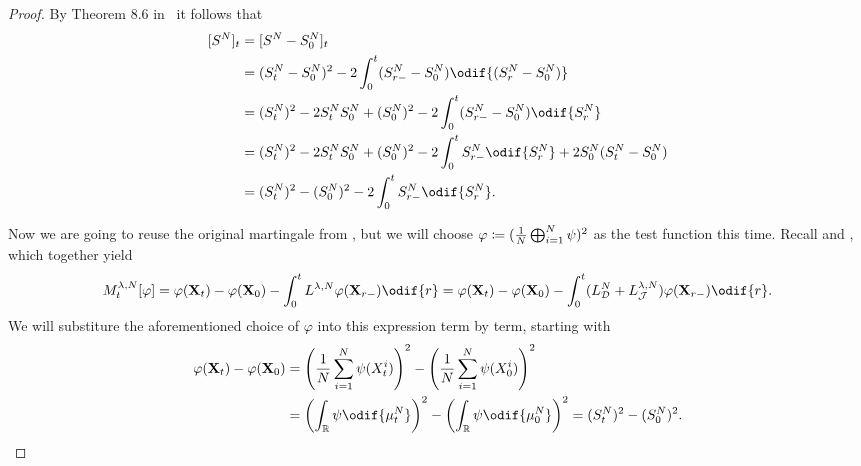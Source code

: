 \begin{proof}
  By Theorem 8.6 in~\cite[221]{klebanerIntroductionStochasticCalculus2012} it follows that
  \begin{equation}\label{eq:S^2-q-var-rel}
    \begin{split}
      \sbr{S^N}_t & = \sbr{S^N - S_0^N}_t                                                                                \\   %
                  & = (S_t^N - S_0^N)^2 - 2 \int_0^t (S_{r-}^N - S_0^N) \odif{\br{S_r^N - S_0^N}}                        \\
                  & = (S_t^N)^2 - 2 S_t^N S_0^N + (S_0^N)^2 - 2 \int_0^t (S_{r-}^N - S_0^N) \odif{S_r^N}                 \\   %
                  & = (S_t^N)^2 - 2 S_t^N S_0^N + (S_0^N)^2 - 2 \int_0^t S_{r-}^N \odif{S_r^N} + 2 S_0^N (S_t^N - S_0^N) \\
                  & = (S_t^N)^2 - (S_0^N)^2 - 2 \int_0^t S_{r-}^N \odif{S_r^N}.
    \end{split}
  \end{equation}

  Now we are going to reuse the original martingale from , but we will choose \(\varphi \coloneqq \lparen \frac{1}{N} \bigoplus_{i=1}^N \psi \rparen^2\) as the test function this time.
  Recall  and , which together yield
  \begin{equation}
    M_t^{\lambda, N}[\varphi]
    = \varphi(\bm{X}_t) - \varphi(\bm{X}_0) - \int_0^t L^{\lambda, N} \varphi (\bm{X}_{r-}) \odif{r}
    = \varphi(\bm{X}_t) - \varphi(\bm{X}_0) - \int_0^t (L_{\cD}^{N} + L_{\cJ}^{\lambda, N}) \varphi (\bm{X}_{r-}) \odif{r}.
  \end{equation}
  We will substiture the aforementioned choice of \( \varphi \) into this expression term by term, starting with
  \begin{equation}
    \begin{split}
      \varphi(\bm{X}_t) - \varphi(\bm{X}_0)
       & = \br*{\frac{1}{N} \sum_{i=1}^N \psi(X_t^i)}^2 - \br*{\frac{1}{N} \sum_{i=1}^N \psi(X_0^i)}^2 \\
       & = \br*{ \int_\potspace \psi \odif{\mu_t^N} }^2 - \br*{ \int_\potspace \psi \odif{\mu_0^N} }^2
      = (S_t^N)^2 - (S_0^N)^2.
    \end{split}
  \end{equation}


\end{proof}
